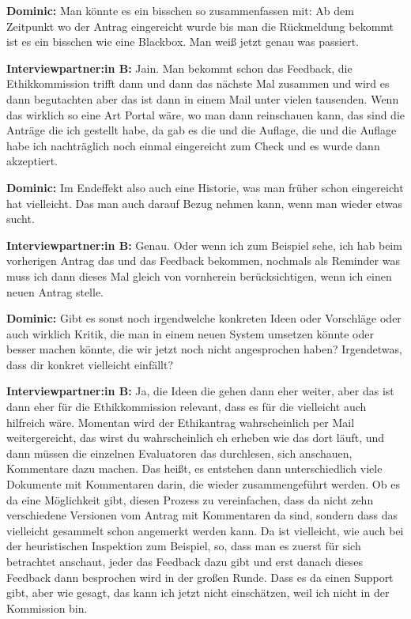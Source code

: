 \documentclass[a4paper,12pt,twoside]{scrreprt}
\begin{document}
\textbf{Dominic:} Man könnte es ein bisschen so zusammenfassen mit: Ab dem Zeitpunkt wo der Antrag eingereicht wurde bis man die Rückmeldung bekommt ist es ein bisschen wie eine Blackbox. Man weiß jetzt genau was passiert.

\textbf{Interviewpartner:in B:} Jain. Man bekommt schon das Feedback, die Ethikkommission trifft dann und dann das nächste Mal zusammen und wird es dann begutachten aber das ist dann in einem Mail unter vielen tausenden. Wenn das wirklich so eine Art Portal wäre, wo man dann reinschauen kann, das sind die Anträge die ich gestellt habe, da gab es die und die Auflage, die und die Auflage habe ich nachträglich noch einmal eingereicht zum Check und es wurde dann akzeptiert.

\textbf{Dominic:} Im Endeffekt also auch eine Historie, was man früher schon eingereicht hat vielleicht. Das man auch darauf Bezug nehmen kann, wenn man wieder etwas sucht.

\textbf{Interviewpartner:in B:} Genau. Oder wenn ich zum Beispiel sehe, ich hab beim vorherigen Antrag das und das Feedback bekommen, nochmals als Reminder was muss ich dann dieses Mal gleich von vornherein berücksichtigen, wenn ich einen neuen Antrag stelle.

\textbf{Dominic:} Gibt es sonst noch irgendwelche konkreten Ideen oder Vorschläge oder auch wirklich Kritik, die man in einem neuen System umsetzen könnte oder besser machen könnte, die wir jetzt noch nicht angesprochen haben? Irgendetwas, dass dir konkret vielleicht einfällt?

\textbf{Interviewpartner:in B:} Ja, die Ideen die gehen dann eher weiter, aber das ist dann eher für die Ethikkommission relevant, dass es für die vielleicht auch hilfreich wäre. Momentan wird der Ethikantrag wahrscheinlich per Mail weitergereicht, das wirst du wahrscheinlich eh erheben wie das dort läuft, und dann müssen die einzelnen Evaluatoren das durchlesen, sich anschauen, Kommentare dazu machen. Das heißt, es entstehen dann unterschiedlich viele Dokumente mit Kommentaren darin, die wieder zusammengeführt werden. Ob es da eine Möglichkeit gibt, diesen Prozess zu vereinfachen, dass da nicht zehn verschiedene Versionen vom Antrag mit Kommentaren da sind, sondern dass das vielleicht gesammelt schon angemerkt werden kann. Da ist vielleicht, wie auch bei der heuristischen Inspektion zum Beispiel, so, dass man es zuerst für sich betrachtet anschaut, jeder das Feedback dazu gibt und erst danach dieses Feedback dann besprochen wird in der großen Runde. Dass es da einen Support gibt, aber wie gesagt, das kann ich jetzt nicht einschätzen, weil ich nicht in der Kommission bin.
\end{document}
